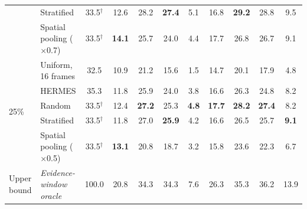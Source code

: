 \begin{table}[t]
\begin{tabular}{llccccccccc}
 & Stratified & 33.5$^\dagger$ & 12.6 & 28.2 & \textbf{27.4} & 5.1 & 16.8 & \textbf{29.2} & 28.8 & 9.5 \\
 & Spatial pooling ($\times$0.7) & 33.5$^\dagger$ & \textbf{14.1} & 25.7 & 24.0 & 4.4 & 17.7 & 26.8 & 26.7 & 9.1 \\
\midrule
\multirow{5}{*}{25\%} & Uniform, 16 frames & 32.5 & 10.9 & 21.2 & 15.6 & 1.5 & 14.7 & 20.1 & 17.9 & 4.8 \\
 & HERMES & 35.3 & 11.8 & 25.9 & 24.0 & 3.8 & 16.6 & 26.3 & 24.8 & 8.2 \\
 & Random & 33.5$^\dagger$ & 12.4 & \textbf{27.2} & 25.3 & \textbf{4.8} & \textbf{17.7} & \textbf{28.2} & \textbf{27.4} & 8.2 \\
 & Stratified & 33.5$^\dagger$ & 11.8 & 27.0 & \textbf{25.9} & 4.2 & 16.6 & 26.5 & 25.7 & \textbf{9.1} \\
 & Spatial pooling ($\times$0.5) & 33.5$^\dagger$ & \textbf{13.1} & 20.8 & 18.7 & 3.2 & 15.8 & 23.6 & 22.3 & 6.7 \\
\midrule
Upper bound & \textit{Evidence-window oracle} & 100.0 & 20.8 & 34.3 & 34.3 & 7.6 & 26.3 & 35.3 & 36.2 & 13.9 \\
\bottomrule
\end{tabular}
\end{table}
